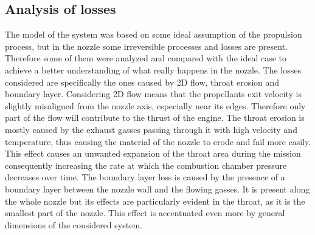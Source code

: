 \subsection{Analysis of losses}
\label{subsec:losses_intro}

The model of the system was based on some ideal assumption of the propulsion process, but in the nozzle some irreversible processes and losses are present. Therefore some of them were analyzed and compared with the ideal case to achieve a better understanding of what really happens in the nozzle.
The losses considered are specifically the ones caused by 2D flow, throat erosion and boundary layer. Considering 2D flow means that the propellants exit velocity is slightly misaligned from the nozzle axis, especially near its edges.
Therefore only part of the flow will contribute to the thrust of the engine. The throat erosion is mostly caused by the exhaust gasses passing through it with high velocity and temperature, thus causing the material of the nozzle to erode and fail more easily.
This effect causes an unwanted expansion of the throat area during the mission consequently increasing the rate at which the combustion chamber pressure decreases over time. The boundary layer loss is caused by the presence of a boundary layer between the nozzle wall and the flowing gasses.
It is present along the whole nozzle but its effects are particularly evident in the throat, as it is the smallest part of the nozzle. This effect is accentuated even more by general dimensions of the considered system.
